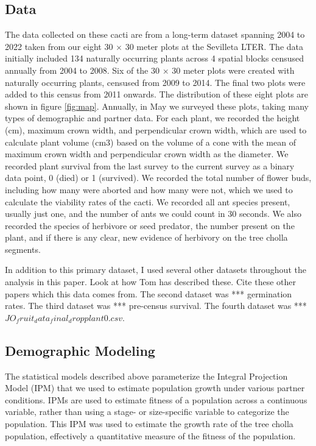 \documentclass[12pt,a4paper]{article}
\begin{document}
	\subsection*{Data}
	
	The data collected on these cacti are from a long-term dataset spanning 2004 to 2022 taken from our eight 30 $\times$ 30 meter plots at the Sevilleta LTER. 
	The data initially included 134 naturally occurring plants across 4 spatial blocks censused annually from 2004 to 2008.
	Six of the 30 $\times$ 30 meter plots were created with naturally occurring plants, censused from 2009 to 2014. 
	The final two plots were added to this census from 2011 onwards. 
	The distribution of these eight plots are shown in figure \ref{fig:map}.
		Annually, in May we surveyed these plots, taking many types of demographic and partner data. 
		For each plant, we recorded the height (cm), maximum crown width, and perpendicular crown width, which are used to calculate plant volume (cm3) based on the volume of a cone with the mean of maximum crown width and perpendicular crown width as the diameter. 
		We recorded plant survival from the last survey to the current survey as a binary data point, 0 (died) or 1 (survived). 
		We recorded the total number of flower buds, including how many were aborted and how many were not, which we used to calculate the viability rates of the cacti. 
		We recorded all ant species present, usually just one, and the number of ants we could count in 30 seconds. 
		We also recorded the species of herbivore or seed predator, the number present on the plant, and if there is any clear, new evidence of herbivory on the tree cholla segments. 
		
		In addition to this primary dataset, I used several other datasets throughout the analysis in this paper.  Look at how Tom has described these. Cite these other papers which this data comes from. 
		The second dataset was *** germination rates.
		The third dataset was *** pre-census survival.
		The fourth dataset was *** $JO_fruit_data_final_dropplant0.csv$.
		
		\subsection*{Demographic Modeling}
		
		The statistical models described above parameterize the Integral Projection Model (IPM) that we used to estimate population growth under various partner conditions.  
		IPMs are used to estimate fitness of a population across a continuous variable, rather than using a stage- or size-specific variable to categorize the population. 
		This IPM was used to estimate the growth rate of the tree cholla population, effectively a quantitative measure of the fitness of the population. 
		
\end{document}
